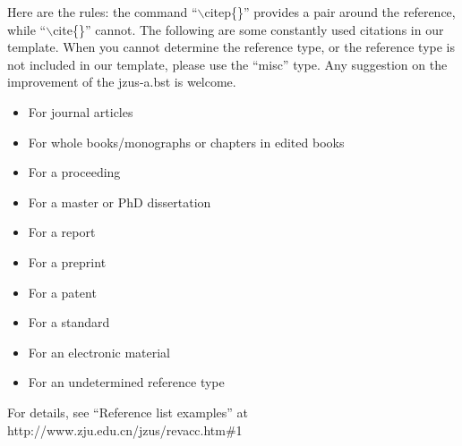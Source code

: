 \documentclass[twoside,twocolumn]{article}
\begin{document}
Here are the rules: the command ``$\backslash$citep\{\}'' provides a pair
around the reference, while ``$\backslash$cite\{\}'' cannot. The
following are some constantly used citations in our template. When
you cannot determine the reference type, or the reference type is
not included in our template, please use the ``misc'' type. Any
suggestion on the improvement of the jzus-a.bst is welcome.
\begin{itemize}
\itemsep -1pt
\item For journal articles \citep{Kampf02, TWFS03, Yu10}
\item For whole books/monographs \citep{Gregersen06} or chapters in edited books \citep{Prigogine76}
\item For a proceeding \citep{GQMPSD06}
\item For a master or PhD dissertation \citep{Rizvi06}
\item For a report \citep{Sweeney00}
\item For a preprint \citep{WAWYCZM08}
\item For a patent \citep{Cookson85}
\item For a standard \citep{ISO82}
\item For an electronic material \citep{Sheffield01}
\item For an undetermined reference type \citep{misc10}
\end{itemize}

\vspace{10.5pt}
For details, see ``Reference list examples'' at http://www.zju.edu.cn/jzus/revacc.htm\#1
\\
\\

\balance



\end{document}
